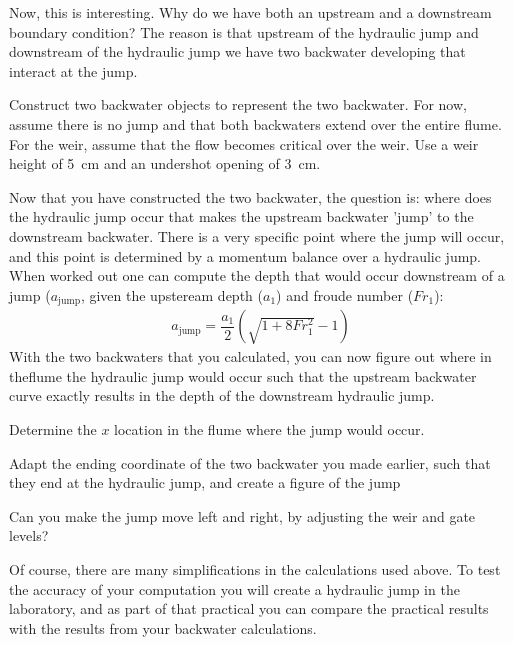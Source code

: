 \documentclass[a4paper]{article}
\begin{document}
Now, this is interesting. Why do we have both an upstream and a downstream boundary condition? The reason is that upstream of the hydraulic jump and downstream of the hydraulic jump we have two backwater developing that interact at the jump. 

\begin{exercise}
  Construct two backwater objects to represent the two backwater. For now, assume there is no jump and that both backwaters extend over the entire flume. For the weir, assume that the flow becomes critical over the weir. Use a weir height of \SI{5}{\cm} and an undershot opening of \SI{3}{\cm}.
\end{exercise}

Now that you have constructed the two backwater, the question is: where does the hydraulic jump occur that makes the upstream backwater 'jump' to the downstream backwater. There is a very specific point where the jump will occur, and this point is determined by a momentum balance over a hydraulic jump. When worked out one can compute the depth  that would occur downstream of a jump ($a_\text{jump}$, given the upsteream depth ($a_1$) and froude number ($Fr_1$):
\begin{align*}
  a_\text{jump}=\dfrac{a_1}{2}(\sqrt{1+8Fr_1^2}-1)
\end{align*}
With the two backwaters that you calculated, you can now figure out where in theflume the hydraulic jump would occur such that the upstream backwater curve exactly results in the depth of the downstream hydraulic jump.

\begin{exercise}
  Determine the $x$ location in the flume where the jump would occur.
\end{exercise}

\begin{exercise}
  Adapt the ending coordinate of the two backwater you made earlier, such that they end at the hydraulic jump, and create a figure of the jump
\end{exercise}

\begin{exercise}
  Can you make the jump move left and right, by adjusting the weir and gate levels?
\end{exercise}

Of course, there are many simplifications in the calculations used above. To test the accuracy of your computation you will create a hydraulic jump in the laboratory, and as part of that practical you can compare the practical results with the results from your backwater calculations.

\printsolutions
\end{document}
